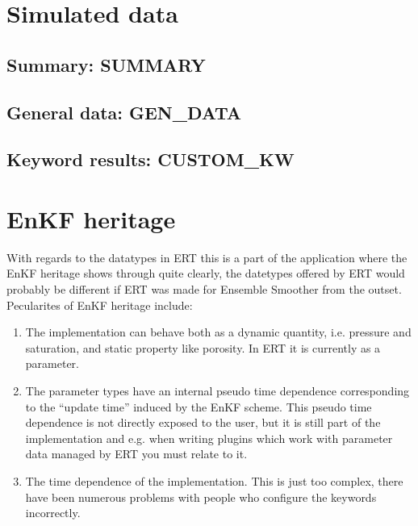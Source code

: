 \documentclass[letterpaper,10pt,english]{sphinxmanual}
\begin{document}
\section{Simulated data}
\label{\detokenize{data_types/index:simulated-data}}

\subsection{Summary: SUMMARY}
\label{\detokenize{data_types/index:summary-summary}}

\subsection{General data: GEN\_DATA}
\label{\detokenize{data_types/index:general-data-gen-data}}

\subsection{Keyword results: CUSTOM\_KW}
\label{\detokenize{data_types/index:keyword-results-custom-kw}}

\section{EnKF heritage}
\label{\detokenize{data_types/index:enkf-heritage}}
With regards to the datatypes in ERT this is a part of the application where the
EnKF heritage shows through quite clearly, the datetypes offered by ERT would
probably be different if ERT was made for Ensemble Smoother from the outset.
Pecularites of EnKF heritage include:
\begin{enumerate}
\item {} 
The  implementation can behave both as a dynamic quantity, i.e.
pressure and saturation, and static property like porosity. In ERT it is
currently  as a parameter.

\item {} 
The parameter types have an internal pseudo time dependence corresponding to
the “update time” induced by the EnKF scheme. This pseudo time dependence is
not directly exposed to the user, but it is still part of the implementation
and e.g. when writing plugins which work with parameter data managed by ERT
you must relate to it.

\item {} 
The time dependence of the  implementation. This is just too
complex, there have been numerous problems with people who configure the
 keywords incorrectly.

\end{enumerate}
\end{document}
